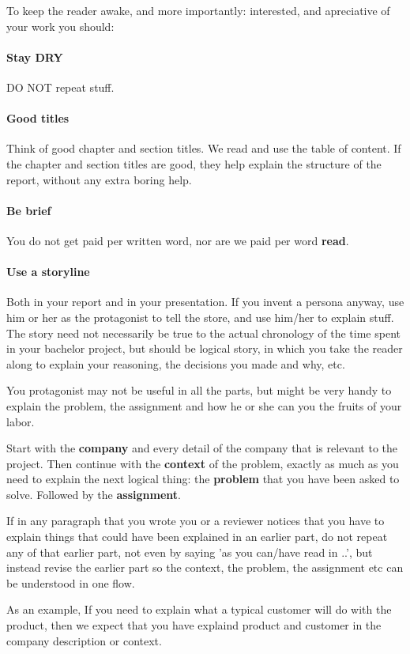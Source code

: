 To keep the reader awake, and more importantly: interested, and apreciative of your work you should:
\paragraph{Stay DRY} DO NOT repeat stuff.
\paragraph{Good titles} Think of good chapter and section titles. We read and use the table of content. If the chapter and section titles are good, they help explain the structure of the report, without any extra boring help.
\paragraph{Be brief} You do not get paid per written word, nor are we paid per word \textbf{read}.
\paragraph{Use a storyline} Both in your report and in your presentation. If you invent a persona anyway, use him or her as the protagonist to tell the store, and use him/her to explain stuff.
The story need not necessarily be true to the actual chronology of the time spent in your bachelor project, but should be logical story, in which you take the reader along to explain your reasoning, the decisions you made and why, etc.

You protagonist may not be useful in all the parts, but might be very handy to explain the problem, the assignment and how he or she can you the fruits of your labor.

Start with the \textbf{company} and every detail of the company that is relevant to the project.
Then continue with the \textbf{context} of the problem, exactly as much as you need to explain the next logical thing: the \textbf{problem} that you have been asked to solve. Followed by the \textbf{assignment}.

If in any paragraph that you wrote you or a reviewer notices that you have to explain things
that could have been explained in an earlier part, do not repeat any of that earlier part,
not even by saying 'as you can/have read in ..', but instead revise the earlier part so the context, the problem, the assignment etc can be understood in one flow.

As an example, If you need to explain what a typical customer will do with the product, then we expect that you have explaind product and customer in the company description or context. 

